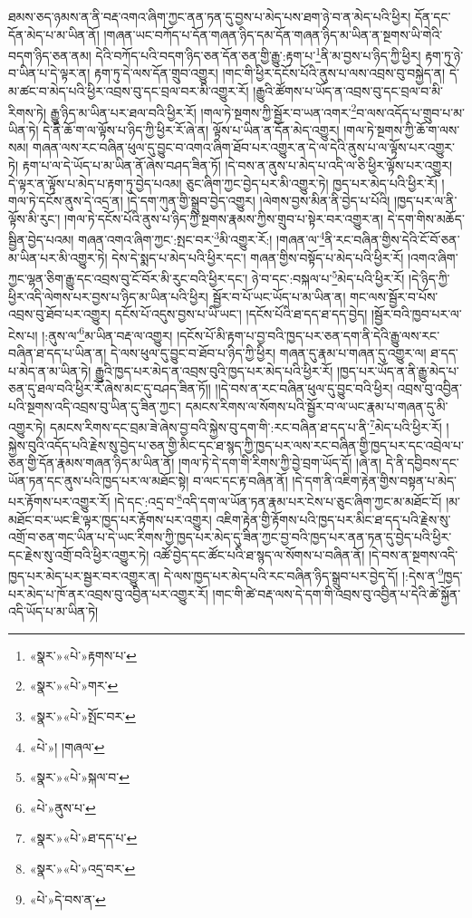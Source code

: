 ཐམས་ཅད་ཉམས་ན་ནི་བརྡ་འགའ་ཞིག་ཀྱང་ནན་ཏན་དུ་བྱས་པ་མེད་པས་ཐག་ཉེ་བ་ན་མེད་པའི་ཕྱིར། དོན་དང་དོན་མེད་པ་མ་ཡིན་ནོ། །གཞན་ཡང་བཀོད་པ་དོན་གཞན་ཉིད་དམ་དོན་གཞན་ཉིད་མ་ཡིན་ན་སྔགས་ཡི་གེའི་བདག་ཉིད་ཅན་ནམ། དེའི་བཀོད་པའི་བདག་ཉིད་ཅན་དོན་ཅན་གྱི་རྒྱུ་:རྟག་པ་\footnote{«སྣར་»«པེ་»རྟགས་པ་}ནི་མ་བྱས་པ་ཉིད་ཀྱི་ཕྱིར། རྟག་ཏུ་ཉེ་བ་ཡིན་པ་དེ་ལྟར་ན། རྟག་ཏུ་དེ་ལས་དོན་གྲུབ་འགྱུར། །གང་གི་ཕྱིར་དངོས་པོའི་ནུས་པ་ལས་འབྲས་བུ་བསྐྱེད་ན། དེ་མ་ཚང་བ་མེད་པའི་ཕྱིར་འབྲས་བུ་དང་བྲལ་བར་མི་འགྱུར་རོ། །རྒྱུའི་ཚོགས་པ་ཡོད་ན་འབྲས་བུ་དང་བྲལ་བ་མི་རིགས་ཏེ། རྒྱུ་ཉིད་མ་ཡིན་པར་ཐལ་བའི་ཕྱིར་རོ། །གལ་ཏེ་སྔགས་ཀྱི་སྦྱོར་བ་ཡན་འགར་\footnote{«སྣར་»«པེ་»གར་}བ་ལས་འདོད་པ་གྲུབ་པ་མ་ཡིན་ཏེ། དེ་ནི་ཆོ་ག་ལ་ལྟོས་པ་ཉིད་ཀྱི་ཕྱིར་རོ་ཞེ་ན། ལྟོས་པ་ཡིན་ན་དོན་མེད་འགྱུར། །གལ་ཏེ་སྔགས་ཀྱི་ཆོ་ག་ལས་སམ། གཞན་ལས་རང་བཞིན་ཕུལ་དུ་བྱུང་བ་འགའ་ཞིག་ཐོབ་པར་འགྱུར་ན་དེ་ལ་དེའི་ནུས་པ་ལ་ལྟོས་པར་འགྱུར་ཏེ། རྟག་པ་ལ་དེ་ཡོད་པ་མ་ཡིན་ནོ་ཞེས་བཤད་ཟིན་ཏོ། །དེ་བས་ན་ནུས་པ་མེད་པ་འདི་ལ་ཅི་ཕྱིར་ལྟོས་པར་འགྱུར། དེ་ལྟར་ན་ལྟོས་པ་མེད་པ་རྟག་ཏུ་བྱེད་པའམ། ཅུང་ཞིག་ཀྱང་བྱེད་པར་མི་འགྱུར་ཏེ། ཁྱད་པར་མེད་པའི་ཕྱིར་རོ། །གལ་ཏེ་དངོས་ནུས་དེ་འདྲ་ན། །དེ་དག་ཀུན་གྱི་སྒྲུབ་བྱེད་འགྱུར། །ལེགས་བྱས་མིན་ནི་བྱེད་པ་པོའི། །ཁྱད་པར་ལ་ནི་ལྟོས་མི་རུང་། །གལ་ཏེ་དངོས་པོའི་ནུས་པ་ཉིད་ཀྱི་སྔགས་རྣམས་ཀྱིས་གྲུབ་པ་སྟེར་བར་འགྱུར་ན། དེ་དག་གིས་མཆོད་སྦྱིན་བྱེད་པའམ། གཞན་འགའ་ཞིག་ཀྱང་:སྤང་བར་\footnote{«སྣར་»«པེ་»སྤོང་བར་}མི་འགྱུར་རོ:། །གཞན་ལ་\footnote{«པེ་»། །གཞལ་}ནི་རང་བཞིན་གྱིས་དེའི་ངོ་བོ་ཅན་མ་ཡིན་པར་མི་འགྱུར་ཏེ། དེས་དེ་སྨད་པ་མེད་པའི་ཕྱིར་དང་། གཞན་གྱིས་བསྟོད་པ་མེད་པའི་ཕྱིར་རོ། །འགའ་ཞིག་ཀྱང་ལྷན་ཅིག་རྒྱུ་དང་འབྲས་བུ་ངོ་བོར་མི་རུང་བའི་ཕྱིར་དང་། ཉེ་བ་དང་:བསྐལ་པ་\footnote{«སྣར་»«པེ་»སྐལ་བ་}མེད་པའི་ཕྱིར་རོ། །དེ་ཉིད་ཀྱི་ཕྱིར་འདི་ལེགས་པར་བྱས་པ་ཉིད་མ་ཡིན་པའི་ཕྱིར། སྦྱོར་བ་པོ་ཡང་ཡོད་པ་མ་ཡིན་ན། གང་ལས་སྦྱོར་བ་པོས་འབྲས་བུ་ཐོབ་པར་འགྱུར། དངོས་པོ་འདུས་བྱས་པ་ཡི་ཡང་། །དངོས་པོའི་ཐ་དད་ཐ་དད་བྱེད། །སྦྱོར་བའི་ཁྱབ་པར་ལ་ངེས་པ། །:ནུས་ལ་\footnote{«པེ་»ནུས་པ་}མ་ཡིན་བརྡ་ལ་འགྱུར། །དངོས་པོ་མི་རྟག་པ་བྱ་བའི་ཁྱད་པར་ཅན་དག་ནི་དེའི་རྒྱུ་ལས་རང་བཞིན་ཐ་དད་པ་ཡིན་ན། དེ་ལས་ཕུལ་དུ་བྱུང་བ་ཐོབ་པ་ཉིད་ཀྱི་ཕྱིར། གཞན་དུ་རྣམ་པ་གཞན་དུ་འགྱུར་ལ། ཐ་དད་པ་མེད་ན་མ་ཡིན་ཏེ། རྒྱུའི་ཁྱད་པར་མེད་ན་འབྲས་བུའི་ཁྱད་པར་མེད་པའི་ཕྱིར་རོ། །ཁྱད་པར་ཡོད་ན་ནི་རྒྱུ་མེད་པ་ཅན་དུ་ཐལ་བའི་ཕྱིར་རོ་ཞེས་མང་དུ་བཤད་ཟིན་ཏོ།། །།དེ་བས་ན་རང་བཞིན་ཕུལ་དུ་བྱུང་བའི་ཕྱིར། འབྲས་བུ་འབྱིན་པའི་སྔགས་འདི་འབྲས་བུ་ཡིན་དུ་ཟིན་ཀྱང་། དམངས་རིགས་ལ་སོགས་པའི་སྦྱོར་བ་ལ་ཡང་རྣམ་པ་གཞན་དུ་མི་འགྱུར་ཏེ། དམངས་རིགས་དང་བྲམ་ཟེ་ཞེས་བྱ་བའི་སྐྱེས་བུ་དག་གི་:རང་བཞིན་ཐ་དད་པ་ནི་\footnote{«སྣར་»«པེ་»ཐ་དད་པ་}མེད་པའི་ཕྱིར་རོ། །སྐྱེས་བུའི་འདོད་པའི་རྗེས་སུ་བྱེད་པ་ཅན་གྱི་མིང་དང་ཐ་སྙད་ཀྱི་ཁྱད་པར་ལས་རང་བཞིན་གྱི་ཁྱད་པར་དང་འབྲེལ་པ་ཅན་གྱི་དོན་རྣམས་གཞན་ཉིད་མ་ཡིན་ནོ། །གལ་ཏེ་དེ་དག་གི་རིགས་ཀྱི་བྱེ་བྲག་ཡོད་དོ། །ཞེ་ན། དེ་ནི་དབྱིབས་དང་ཡོན་ཏན་དང་ནུས་པའི་ཁྱད་པར་ལ་མཐོང་སྟེ། བ་ལང་དང་རྟ་བཞིན་ནོ། །དེ་དག་ནི་འཇིག་རྟེན་གྱིས་བསྟན་པ་མེད་པར་རྟོགས་པར་འགྱུར་རོ། །དེ་དང་:འདྲ་བ་\footnote{«སྣར་»«པེ་»འདྲ་བར་}འདི་དག་ལ་ཡོན་ཏན་རྣམ་པར་ངེས་པ་ཅུང་ཞིག་ཀྱང་མ་མཐོང་ངོ། །མ་མཐོང་བར་ཡང་ཇི་ལྟར་ཁྱད་པར་རྟོགས་པར་འགྱུར། འཇིག་རྟེན་གྱི་རྟོགས་པའི་ཁྱད་པར་མིང་ཐ་དད་པའི་རྗེས་སུ་འགྲོ་བ་ཅན་གང་ཡིན་པ་དེ་ཡང་རིགས་ཀྱི་ཁྱད་པར་མེད་དུ་ཟིན་ཀྱང་བྱ་བའི་ཁྱད་པར་ནན་ཏན་དུ་བྱེད་པའི་ཕྱིར་དང་རྗེས་སུ་འགྲོ་བའི་ཕྱིར་འགྱུར་ཏེ། འཚོ་བྱེད་དང་ཚོང་པའི་ཐ་སྙད་ལ་སོགས་པ་བཞིན་ནོ། །དེ་བས་ན་སྔགས་འདི་ཁྱད་པར་མེད་པར་སྦྱར་བར་འགྱུར་ན། དེ་ལས་ཁྱད་པར་མེད་པའི་རང་བཞིན་ཉིད་སྒྲུབ་པར་བྱེད་དོ། །:དེས་ན་\footnote{«པེ་»དེ་བས་ན་}ཁྱད་པར་མེད་པ་ཁོ་ནར་འབྲས་བུ་འབྱིན་པར་འགྱུར་རོ། །གང་གི་ཚེ་བརྡ་ལས་དེ་དག་གི་འབྲས་བུ་འབྱིན་པ་དེའི་ཚེ་སྐྱོན་འདི་ཡོད་པ་མ་ཡིན་ཏེ། 
